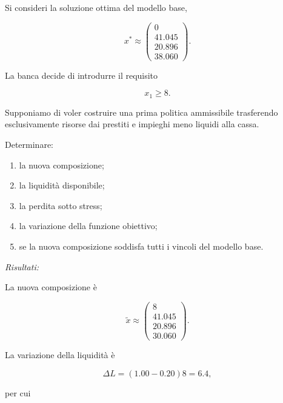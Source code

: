 \begin{exercise}

\label{ex:cap11-proposto-cassa-minima}

Si consideri la soluzione ottima del modello base,

\[
x^*
\approx
\begin{pmatrix}
0\\
41.045\\
20.896\\
38.060
\end{pmatrix}.
\]

La banca decide di introdurre il requisito

\[
x_1\geq8.
\]

Supponiamo di voler costruire una prima politica ammissibile trasferendo
esclusivamente risorse dai prestiti e impieghi meno liquidi alla cassa.

Determinare:

\begin{enumerate}

\item la nuova composizione;

\item la liquidit\`a disponibile;

\item la perdita sotto stress;

\item la variazione della funzione obiettivo;

\item se la nuova composizione soddisfa tutti i vincoli del modello base.

\end{enumerate}

\end{exercise}

\noindent
\textit{Risultati:}

La nuova composizione \`e

\[
\widetilde x
\approx
\begin{pmatrix}
8\\
41.045\\
20.896\\
30.060
\end{pmatrix}.
\]

La variazione della liquidit\`a \`e

\[
\Delta L
=
(1.00-0.20)8
=
6.4,
\]

\noindent per cui

